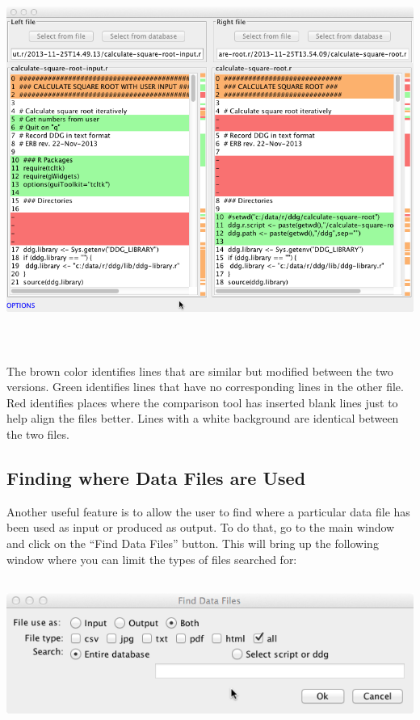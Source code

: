 \documentclass[12pt]{article}
\begin{document}
{ \includegraphics[width=6.5in,height=4.8752in]{UsingDDGExplorer-img/UsingDDGExplorer-img011.png} 

{\mdseries\upshape\color{black}
The brown color identifies lines that are similar but modified between the two versions. Green identifies lines that have no corresponding lines in the other file. Red identifies places where the comparison tool has inserted blank lines just to help align the files better. Lines with a white background are identical between the two files.}

\subsection{Finding where Data Files are Used}
{\mdseries\upshape\color{black}
Another useful feature is to allow the user to find where a particular data file has been used as input or produced as output. To do that, go to the main window and click on the “Find Data Files” button. This will bring up the following window where you can limit the types of files searched for:}

 \includegraphics[width=6.5in,height=1.9283in]{UsingDDGExplorer-img/UsingDDGExplorer-img012.png} 

}
\end{document}
